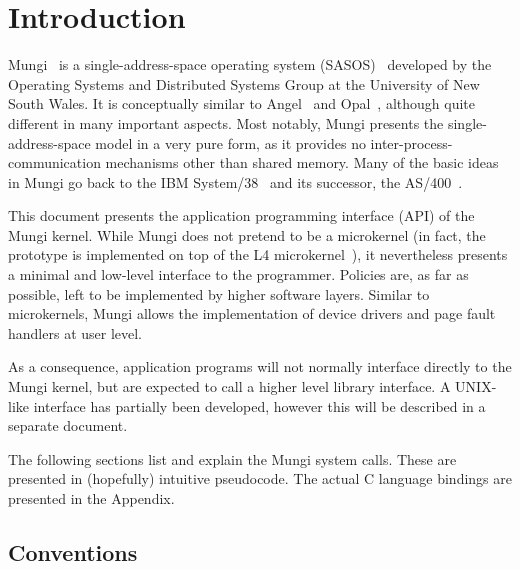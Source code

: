 \documentclass[a4paper,11pt,twoside,dvips]{report}
\begin{document}
\setcounter{page}{3}
\tableofcontents

\cleardoublepage
\setcounter{page}{1}

\chapter{Introduction}

Mungi~\cite{Russell_SEHBGH_92, Heiser_ERH_93:tr,
Vochteloo_RH_93, Heiser_ERV_94, Elphinstone_RHL_96, Vochteloo_ERH_96,
Heiser_EVRL_98, Deller_Heiser_99} is a single-address-space
operating system (SASOS)~\cite{Chase_LFL_94, Wilkinson_MRHL_95:tr}
developed by the Operating Systems and Distributed Systems Group at the
University of New South Wales. It is conceptually similar to
Angel~\cite{Wilkinson_SGWOSK_92, Wilkinson_Murray_96} and
Opal~\cite{Chase_LBL_92, Chase_LFL_94}, although quite different in many
important aspects. Most notably, Mungi presents the single-address-space
model in a very pure form, as it provides no
inter-process-commu\-ni\-cation mechanisms other than shared
memory. Many of the basic ideas in Mungi go back to the IBM
System/38~\cite{Berstis_80, Houdek_SH_81} and its successor, the
AS/400~\cite{Soltis:as400}.

This document presents the application programming interface (API) of
the Mungi kernel. While Mungi does not pretend to be a microkernel (in
fact, the prototype is implemented on top of the L4
microkernel~\cite{Liedtke_95}), it nevertheless presents a minimal and
low-level interface to the programmer. Policies are, as far as possible,
left to be implemented by higher software layers. Similar to
microkernels, Mungi allows the implementation of device drivers and page
fault handlers at user level.

As a consequence, application programs will not normally interface
directly to the Mungi kernel, but are expected to call a higher level
library interface. A UNIX-like interface has partially been developed,
however this will be described in a separate document.

The following sections list and explain the Mungi system calls. These
are presented in (hopefully) intuitive pseudocode. The actual C language
bindings are presented in the Appendix.

\section{\label{s:conv}Conventions}
\end{document}

